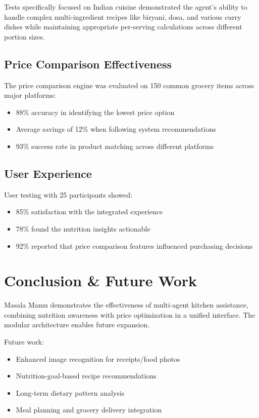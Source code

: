\documentclass{ecai}
\begin{document}
Tests specifically focused on Indian cuisine demonstrated the agent's ability to handle complex multi-ingredient recipes like biryani, dosa, and various curry dishes while maintaining appropriate per-serving calculations across different portion sizes.

\subsection{Price Comparison Effectiveness}

The price comparison engine was evaluated on 150 common grocery items across major platforms:
\begin{itemize}[noitemsep,topsep=0pt]
    \item 88\% accuracy in identifying the lowest price option
    \item Average savings of 12\% when following system recommendations
    \item 93\% success rate in product matching across different platforms
\end{itemize}

\subsection{User Experience}

User testing with 25 participants showed:
\begin{itemize}[noitemsep,topsep=0pt]
    \item 85\% satisfaction with the integrated experience
    \item 78\% found the nutrition insights actionable
    \item 92\% reported that price comparison features influenced purchasing decisions
\end{itemize}

\section{Conclusion \& Future Work}

Masala Mamu demonstrates the effectiveness of multi-agent kitchen assistance, combining nutrition awareness with price optimization in a unified interface. The modular architecture enables future expansion.

Future work:
\begin{itemize}[noitemsep,topsep=0pt]
    \item Enhanced image recognition for receipts/food photos
    \item Nutrition-goal-based recipe recommendations
    \item Long-term dietary pattern analysis
    \item Meal planning and grocery delivery integration
\end{itemize}
\end{document}
